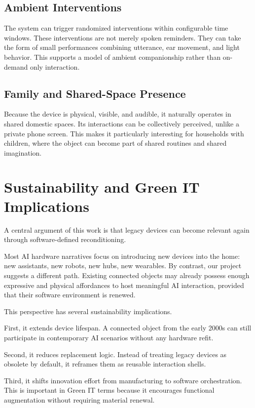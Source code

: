 \documentclass[11pt]{article}
\begin{document}
\subsection{Ambient Interventions}

The system can trigger randomized interventions within configurable time windows. These interventions are not merely spoken reminders. They can take the form of small performances combining utterance, ear movement, and light behavior. This supports a model of ambient companionship rather than on-demand only interaction.

\subsection{Family and Shared-Space Presence}

Because the device is physical, visible, and audible, it naturally operates in shared domestic spaces. Its interactions can be collectively perceived, unlike a private phone screen. This makes it particularly interesting for households with children, where the object can become part of shared routines and shared imagination.

\section{Sustainability and Green IT Implications}

A central argument of this work is that legacy devices can become relevant again through software-defined reconditioning.

Most AI hardware narratives focus on introducing new devices into the home: new assistants, new robots, new hubs, new wearables. By contrast, our project suggests a different path. Existing connected objects may already possess enough expressive and physical affordances to host meaningful AI interaction, provided that their software environment is renewed.

This perspective has several sustainability implications.

First, it extends device lifespan. A connected object from the early 2000s can still participate in contemporary AI scenarios without any hardware refit.

Second, it reduces replacement logic. Instead of treating legacy devices as obsolete by default, it reframes them as reusable interaction shells.

Third, it shifts innovation effort from manufacturing to software orchestration. This is important in Green IT terms because it encourages functional augmentation without requiring material renewal.
\end{document}
